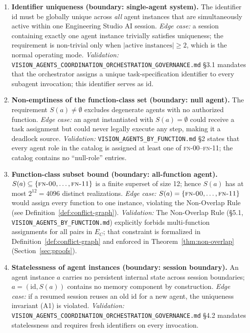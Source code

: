 \documentclass[12pt]{article}
\theoremstyle{definition}
\newcommand{\code}[1]{\texttt{#1}}
\newcommand{\FN}[1]{\textsc{fn-#1}}
\newcommand{\VisionGov}{\code{VISION\_AGENTS\_\allowbreak COORDINATION\_\allowbreak ORCHESTRATION\_\allowbreak GOVERNANCE.md}}
\newcommand{\VisionFunc}{\code{VISION\_AGENTS\_\allowbreak BY\_FUNCTION.md}}
\begin{document}
\begin{enumerate}[label=\textbf{A\arabic*.}, leftmargin=*, widest=A9]

  \item \textbf{Identifier uniqueness (boundary: single-agent system).}
        The identifier $\mathrm{id}$ must be globally unique across
        \emph{all} agent instances that are simultaneously active within
        one Engineering Studio AI session.
        \emph{Edge case:} a session containing exactly one agent instance
        trivially satisfies uniqueness; the requirement is non-trivial
        only when $\lvert\text{active instances}\rvert \geq 2$, which is
        the normal operating mode.
        \emph{Validation:} \VisionGov{} \S3.1 mandates that the
        orchestrator assigns a unique task-specification identifier to
        every subagent invocation; this identifier serves as $\mathrm{id}$.

  \item \textbf{Non-emptiness of the function-class set (boundary: null
        agent).}
        The requirement $S(a) \neq \emptyset$ excludes degenerate agents
        with no authorized function.
        \emph{Edge case:} an agent instantiated with $S(a) = \emptyset$
        could receive a task assignment but could never legally execute
        any step, making it a deadlock source.
        \emph{Validation:} \VisionFunc{} \S2 states that every agent role
        in the catalog is assigned at least one of \FN{00}--\FN{11};
        the catalog contains no ``null-role'' entries.

  \item \textbf{Function-class subset bound (boundary: all-function
        agent).}
        $S(a) \subseteq \{\FN{00},\ldots,\FN{11}\}$ is a finite
        superset of size 12; hence $S(a)$ has at most $2^{12} = 4096$
        distinct realizations.
        \emph{Edge case:} $S(a) = \{\FN{00},\ldots,\FN{11}\}$ would
        assign every function to one instance, violating the Non-Overlap
        Rule (see Definition~\ref{def:conflict-graph}).
        \emph{Validation:} The Non-Overlap Rule (\S5.1, \VisionFunc{})
        explicitly forbids multi-function assignments for all pairs in
        $E_C$; that constraint is formalized in
        Definition~\ref{def:conflict-graph} and enforced in
        Theorem~\ref{thm:non-overlap} (Section~\ref{sec:proofs}).

  \item \textbf{Statelessness of agent instances (boundary: session
        boundary).}
        An agent instance $a$ carries no persistent internal state
        across session boundaries; $a = (\mathrm{id}, S(a))$ contains
        no memory component by construction.
        \emph{Edge case:} if a resumed session reuses an old $\mathrm{id}$
        for a new agent, the uniqueness invariant (A1) is violated.
        \emph{Validation:} \VisionGov{} \S4.2 mandates statelessness and
        requires fresh identifiers on every invocation.


\end{enumerate}
\end{document}
